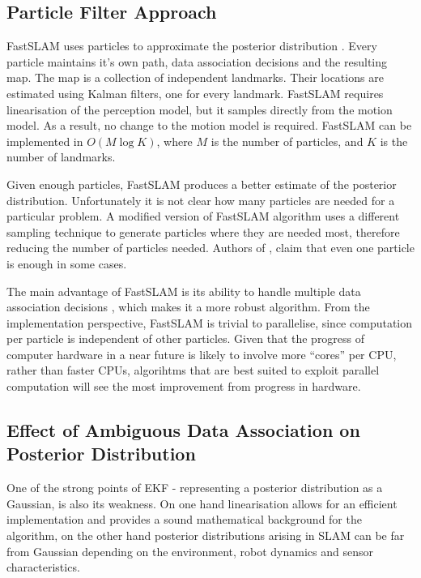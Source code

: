 \subsection{Particle Filter Approach}
FastSLAM uses particles to approximate the posterior distribution
\cite{fastslam}. Every particle maintains it's own path, data
association decisions and the resulting map. The map is a collection
of independent landmarks. Their locations are estimated using Kalman
filters, one for every landmark. FastSLAM requires linearisation of
the perception model, but it samples directly from the motion model.
As a result, no change to the motion model is required. FastSLAM can
be implemented in $O(M\log K)$, where $M$ is the number of particles,
and $K$ is the number of landmarks.

Given enough particles, FastSLAM produces a better estimate of the
posterior distribution.  Unfortunately it is not clear how many
particles are needed for a particular problem. A modified version of
FastSLAM algorithm \cite{fastslam2} uses a different sampling
technique to generate particles where they are needed most, therefore
reducing the number of particles needed. Authors of \cite{fastslam2},
claim that even one particle is enough in some cases.

The main advantage of FastSLAM is its ability to handle multiple data
association decisions \cite{Montemerlo2003}, which makes it a more
robust algorithm. From the implementation perspective, FastSLAM is
trivial to parallelise, since computation per particle is independent
of other particles. Given that the progress of computer hardware in a
near future is likely to involve more ``cores'' per CPU, rather than
faster CPUs, algorihtms that are best suited to exploit parallel
computation will see the most improvement from progress in hardware.

\subsection{Effect of Ambiguous Data Association on Posterior
  Distribution}
\label{sec:AmbiguousDA}

One of the strong points of EKF - representing a posterior
distribution as a Gaussian, is also its weakness. On one hand
linearisation allows for an efficient implementation and provides a
sound mathematical background for the algorithm, on the other hand
posterior distributions arising in SLAM can be far from Gaussian
depending on the environment, robot dynamics and sensor
characteristics. 

